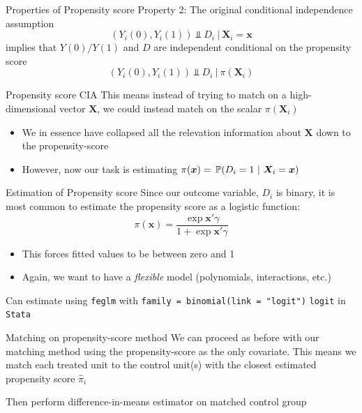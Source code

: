\documentclass[aspectratio=169,t,11pt,table]{beamer}
\begin{document}
\begin{frame}{Properties of Propensity score}
  Property 2: The original conditional independence assumption
  $$
    (Y_{i}(0), Y_{i}(1)) \Perp D_i \ \vert \ \bm{X}_i = \bm{x}
  $$
  implies that $Y(0)/Y(1)$ and $D$ are independent conditional on the propensity score
  $$
    (Y_{i}(0), Y_{i}(1)) \Perp D_i \ \vert \ \pi(\bm{X}_i)
  $$
\end{frame}

\begin{frame}{Propensity score CIA}
  This means instead of trying to match on a high-dimensional vector $\bm{X}$, we could instead match on the scalar $\pi(\bm{X}_i)$
  \begin{itemize}
    \item We in essence have collapsed all the relevation information about $\bm{X}$ down to the propensity-score
    
    \item However, now our task is estimating $\pi(\bm{x}) = \prob{D_i = 1}{\bm{X}_i = \bm{x}}$
  \end{itemize}
\end{frame}

\begin{frame}{Estimation of Propensity score}
  Since our outcome variable, $D_i$ is binary, it is most common to estimate the propensity score as a logistic function:
  $$
    \pi(\bm{x}) = \frac{\exp{\bm{x}' \gamma}}{1 + \exp{\bm{x}' \gamma}}
  $$
  \begin{itemize}
    \item This forces fitted values to be between zero and 1
    \item Again, we want to have a \emph{flexible} model (polynomials, interactions, etc.)
  \end{itemize}

  \pause
  \bigskip
  Can estimate using \texttt{feglm} with \texttt{family = binomial(link = "logit")} \texttt{logit} in \texttt{Stata}
\end{frame}

\begin{frame}{Matching on propensity-score method}
  We can proceed as before with our matching method using the propensity-score as the only covariate. This means we match each treated unit to the control unit(s) with the closest estimated propensity score $\hat{\pi}_i$

  \bigskip
  Then perform difference-in-means estimator on matched control group
\end{frame}
\end{document}
